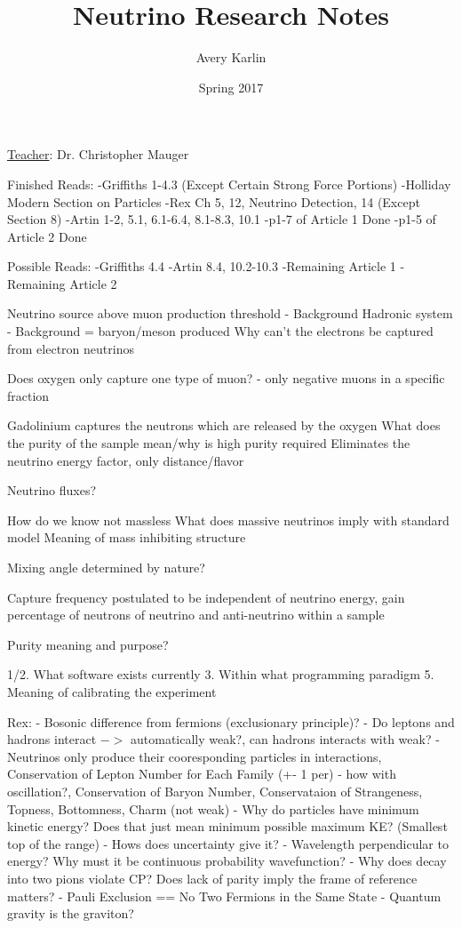 \documentclass[11 pt, twoside]{article}
\begin{document}
\title{Neutrino Research Notes}
\author{Avery Karlin}
\date{Spring 2017}
\newcommand{\teacher}{Dr. Christopher Mauger}

\maketitle
\newpage
\hypertarget{content}{\tableofcontents}
\vspace{11pt}
\noindent
\underline{Teacher}: \teacher
\newpage

Finished Reads: 
	-Griffiths 1-4.3 (Except Certain Strong Force Portions)
	-Holliday Modern Section on Particles
	-Rex Ch 5, 12, Neutrino Detection, 14 (Except Section 8)
	-Artin 1-2, 5.1, 6.1-6.4, 8.1-8.3, 10.1
	-p1-7 of Article 1 Done
	-p1-5 of Article 2 Done

Possible Reads:
	-Griffiths 4.4
	-Artin 8.4, 10.2-10.3
	-Remaining Article 1
	-Remaining Article 2

Neutrino source above muon production threshold - Background
Hadronic system - Background = baryon/meson produced
Why can't the electrons be captured from electron neutrinos

Does oxygen only capture one type of muon? - only negative muons in a specific fraction

Gadolinium captures the neutrons which are released by the oxygen
What does the purity of the sample mean/why is high purity required
Eliminates the neutrino energy factor, only distance/flavor

Neutrino fluxes?

How do we know not massless
What does massive neutrinos imply with standard model
Meaning of mass inhibiting structure

Mixing angle determined by nature?

Capture frequency postulated to be independent of neutrino energy, gain percentage of neutrons of neutrino and anti-neutrino within a sample

Purity meaning and purpose?

1/2. What software exists currently
3. Within what programming paradigm
5. Meaning of calibrating the experiment

Rex:
- Bosonic difference from fermions (exclusionary principle)?
- Do leptons and hadrons interact $->$ automatically weak?, can hadrons interacts with weak?
- Neutrinos only produce their cooresponding particles in interactions, Conservation of Lepton Number for Each Family (+- 1 per) - how with oscillation?, Conservation of Baryon Number, Conservataion of Strangeness, Topness, Bottomness, Charm (not weak)
- Why do particles have minimum kinetic energy? Does that just mean minimum possible maximum KE? (Smallest top of the range) - Hows does uncertainty give it?
- Wavelength perpendicular to energy? Why must it be continuous probability wavefunction?
- Why does decay into two pions violate CP? Does lack of parity imply the frame of reference matters?
- Pauli Exclusion == No Two Fermions in the Same State
- Quantum gravity is the graviton?
\end{document}
